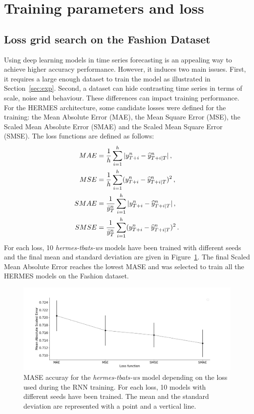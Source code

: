 \documentclass[review]{elsarticle}
\newcommand{\ts}{y}
\newcommand{\tspred}{\widehat{\ts}}
\newcommand{\lag}{h}
\newcommand{\meants}{\Bar{\ts}}
\begin{document}
\section{Training parameters and loss}

\subsection{Loss grid search on the Fashion Dataset}
\label{sec:fashiongridsearch}

Using deep learning models in time series forecasting is an appealing way to achieve higher accuracy performance. However, it induces two main issues. First, it requires a large enough dataset to train the model as illustrated in Section~\ref{sec:exp}. Second, a dataset can hide contrasting time series in terms of scale, noise and behaviour. These differences can impact training performance. For the HERMES architecture, some candidate losses were defined for the training: the Mean Absolute Error (MAE), the Mean Square Error (MSE),  the Scaled Mean Absolute Error (SMAE) and the Scaled Mean Square Error (SMSE). The loss functions are defined as follows:
\begin{align*}
MAE &= \frac{1}{\lag}\sum_{i=1}^{\lag}|\ts^n_{T+i} - \tspred^n_{T+i|T}|\,,\\
MSE &= \frac{1}{\lag}\sum_{i=1}^{\lag}(\ts^n_{T+i} - \tspred^n_{T+i|T})^2\,,\\
SMAE &= \frac{1}{\meants^n_T}\sum_{i=1}^{\lag}|\ts^n_{T+i} - \tspred^n_{T+i|T}|\,,\\
SMSE &= \frac{1}{\meants^n_T}\sum_{i=1}^{\lag}(\ts^n_{T+i} - \tspred^n_{T+i|T})^2\,.
\end{align*}
For each loss, 10 \textit{hermes-tbats-ws} models have been trained with different seeds and the final mean and standard deviation are given in Figure~\ref{fig:loss_function}. The final Scaled Mean Absolute Error reaches the lowest MASE and was selected to train all the HERMES models on the Fashion dataset.

\begin{figure}
  \centering
    \includegraphics[width=1.\linewidth]{loss_function}
  \caption{MASE accuray for the \textit{hermes-tbats-ws} model depending on the loss used during the RNN training. For each loss, 10 models with different seeds have been trained. The mean and the standard deviation are represented with a point and a vertical line.}
\label{fig:loss_function}
\end{figure}
\end{document}
